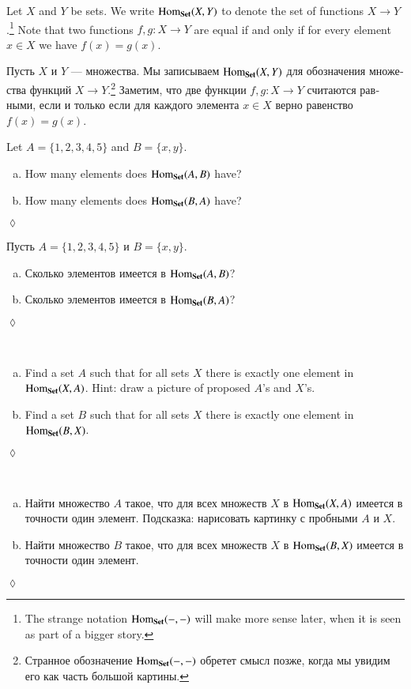 \documentclass[a4paper]{book}
\def\tn{\textnormal}
\def\Hom{\tn{Hom}}
\def\to{\rightarrow}
\def\taking{\colon}
\def\Set{{\bf Set}}
\theoremstyle{myth}
\newtheorem{excENG}[envENG]{\begin{english}Exercise\end{english}}
\newenvironment{exerciseENG}{\begin{excENG}}{\hspace*{\fill}$\lozenge$\end{excENG}}
\newtheorem{excRUS}[envRUS]{\begin{russian}Упражнение\end{russian}}
\newenvironment{exerciseRUS}{\begin{excRUS}}{\hspace*{\fill}$\lozenge$\end{excRUS}}
\def\sexc{\begin{enumerate}[a.)]\setlength{\itemsep}{.1cm}\setlength{\parskip}{.1cm}\item}
\def\next{\item}
\def\endsexc{\end{enumerate}}
\begin{document}
\begin{english}
Let $X$ and $Y$ be sets. We write $\Hom_\Set(X,Y)$\index{a symbol!$\Hom_\Set$} to denote the set of functions $X\to Y$.\footnote{The strange notation $\Hom_\Set(-,-)$ will make more sense later, when it is seen as part of a bigger story.} 
Note that two functions $f,g\taking X\to Y$ are equal if and only if for every element $x\in X$ we have $f(x)=g(x)$. 

\begin{russian}
Пусть $X$ и $Y$ — множества. Мы записываем $\Hom_\Set(X,Y)$\index{a symbol!$\Hom_\Set$} для обозначения множества функций $X\to Y$.\footnote{Странное обозначение $\Hom_\Set(-,-)$ обретет смысл позже, когда мы увидим его как часть большой картины.} 
Заметим, что две функции $f,g\taking X\to Y$ считаются равными, если и только если для каждого элемента $x\in X$ верно равенство $f(x)=g(x)$. 
\end{russian}

\begin{exerciseENG}
Let $A=\{1,2,3,4,5\}$ and $B=\{x,y\}.$ 
\sexc How many elements does $\Hom_\Set(A,B)$ have? 
\next How many elements does $\Hom_\Set(B,A)$ have?
\endsexc
\end{exerciseENG}

\begin{exerciseRUS}
\begin{russian}
Пусть $A=\{1,2,3,4,5\}$ и $B=\{x,y\}.$ 
\sexc Сколько элементов имеется в $\Hom_\Set(A,B)$? 
\next Сколько элементов имеется в $\Hom_\Set(B,A)$?
\endsexc
\end{russian}
\end{exerciseRUS}

\begin{exerciseENG}~
\sexc Find a set $A$ such that for all sets $X$ there is exactly one element in $\Hom_\Set(X,A)$. Hint: draw a picture of proposed $A$'s and $X$'s.
\next Find a set $B$ such that for all sets $X$ there is exactly one element in $\Hom_\Set(B,X)$.
\endsexc 
\end{exerciseENG}

\begin{exerciseRUS}~
\begin{russian}
\sexc Найти множество $A$ такое, что для всех множеств $X$ в $\Hom_\Set(X,A)$ имеется в точности один элемент. Подсказка: нарисовать картинку с пробными $A$ и $X$.
\next Найти множество $B$ такое, что для всех множеств $X$ в $\Hom_\Set(B,X)$ имеется в точности один элемент.
\endsexc 
\end{russian}
\end{exerciseRUS}


\end{english}
\end{document}
